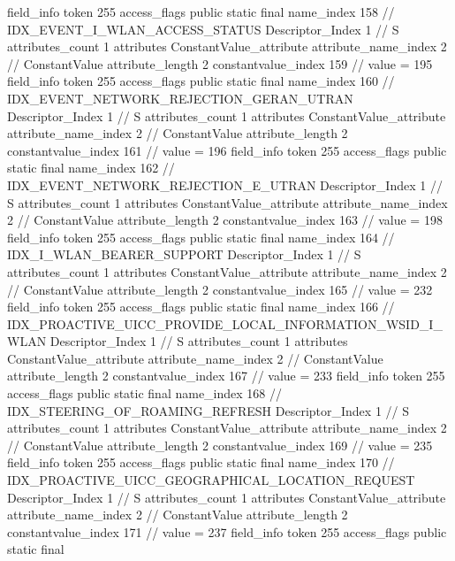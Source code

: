 {{{{{{{				}
				}
			}
			field_info {
				token	255
				access_flags	public static final
				name_index	158		// IDX_EVENT_I_WLAN_ACCESS_STATUS
				Descriptor_Index	1		// S
				attributes_count	1
				attributes {
				ConstantValue_attribute {
					attribute_name_index	2		// ConstantValue
					attribute_length	2
					constantvalue_index	159		// value = 195
				}
				}
			}
			field_info {
				token	255
				access_flags	public static final
				name_index	160		// IDX_EVENT_NETWORK_REJECTION_GERAN_UTRAN
				Descriptor_Index	1		// S
				attributes_count	1
				attributes {
				ConstantValue_attribute {
					attribute_name_index	2		// ConstantValue
					attribute_length	2
					constantvalue_index	161		// value = 196
				}
				}
			}
			field_info {
				token	255
				access_flags	public static final
				name_index	162		// IDX_EVENT_NETWORK_REJECTION_E_UTRAN
				Descriptor_Index	1		// S
				attributes_count	1
				attributes {
				ConstantValue_attribute {
					attribute_name_index	2		// ConstantValue
					attribute_length	2
					constantvalue_index	163		// value = 198
				}
				}
			}
			field_info {
				token	255
				access_flags	public static final
				name_index	164		// IDX_I_WLAN_BEARER_SUPPORT
				Descriptor_Index	1		// S
				attributes_count	1
				attributes {
				ConstantValue_attribute {
					attribute_name_index	2		// ConstantValue
					attribute_length	2
					constantvalue_index	165		// value = 232
				}
				}
			}
			field_info {
				token	255
				access_flags	public static final
				name_index	166		// IDX_PROACTIVE_UICC_PROVIDE_LOCAL_INFORMATION_WSID_I_WLAN
				Descriptor_Index	1		// S
				attributes_count	1
				attributes {
				ConstantValue_attribute {
					attribute_name_index	2		// ConstantValue
					attribute_length	2
					constantvalue_index	167		// value = 233
				}
				}
			}
			field_info {
				token	255
				access_flags	public static final
				name_index	168		// IDX_STEERING_OF_ROAMING_REFRESH
				Descriptor_Index	1		// S
				attributes_count	1
				attributes {
				ConstantValue_attribute {
					attribute_name_index	2		// ConstantValue
					attribute_length	2
					constantvalue_index	169		// value = 235
				}
				}
			}
			field_info {
				token	255
				access_flags	public static final
				name_index	170		// IDX_PROACTIVE_UICC_GEOGRAPHICAL_LOCATION_REQUEST
				Descriptor_Index	1		// S
				attributes_count	1
				attributes {
				ConstantValue_attribute {
					attribute_name_index	2		// ConstantValue
					attribute_length	2
					constantvalue_index	171		// value = 237
				}
				}
			}
			field_info {
				token	255
				access_flags	public static final
}}}}}

